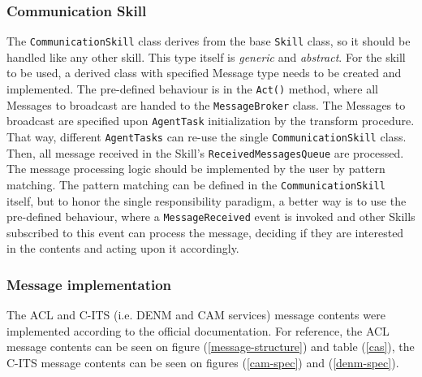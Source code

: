 \documentclass[main.tex]{subfiles}
\begin{document}
\subsubsection{Communication Skill}

The \texttt{CommunicationSkill} class derives from the base \texttt{Skill} class, so it should
be handled like any other skill. This type itself is \emph{generic} and \emph{abstract}. For
the skill to be used, a derived class with specified Message type needs to be created and
implemented. The pre-defined behaviour is in the \texttt{Act()} method, where all Messages to
broadcast are handed to the \texttt{MessageBroker} class.  The Messages to broadcast are
specified upon \texttt{AgentTask} initialization by the transform procedure. That way,
different \texttt{AgentTasks} can re-use the single \texttt{CommunicationSkill} class.  Then,
all message received in the Skill's \texttt{ReceivedMessagesQueue} are processed. The message
processing logic should be implemented by the user by pattern matching. The pattern matching
can be defined in the \texttt{CommunicationSkill} itself, but to honor the single
responsibility paradigm, a better way is to use the pre-defined behaviour, where a
\texttt{MessageReceived} event is invoked and other Skills subscribed to this event can process
the message, deciding if they are interested in the contents and acting upon it accordingly. 

\subsubsection{Message implementation}

The ACL and C-ITS (i.e. DENM and CAM services) message contents were implemented according to 
the official documentation. For reference, the ACL message contents can be seen on figure
(\ref{message-structure}) and table (\ref{cas}), the C-ITS message contents can be seen 
on figures (\ref{cam-spec}) and (\ref{denm-spec}).
\end{document}
